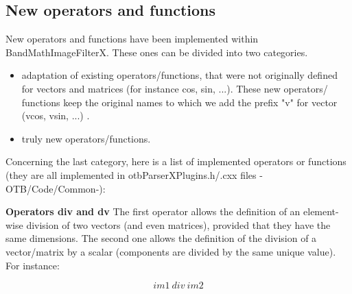 \begin{center}
\end{center}


\subsection{New operators and functions}\label{ssec:operators}

New operators and functions have been implemented within 
BandMathImageFilterX. These ones can be divided into two categories.

\begin{itemize}
\item adaptation of existing operators/functions, that were not originally defined for vectors and matrices (for instance cos, sin, ...). These new operators/ functions keep the original names to which we add the prefix "v" for vector (vcos, vsin, ...) .
\item truly new operators/functions.
\end{itemize}


Concerning the last category, here is a list of implemented 
operators or functions (they are all implemented in 
otbParserXPlugins.h/.cxx files -OTB/Code/Common-):

\textbf{Operators div and dv} \newline
The first operator allows the definition of an element-wise division of two vectors (and even matrices), provided that they have the same dimensions.
The second one allows the definition of the division of a vector/matrix by a scalar (components are divided by the same unique value). For instance: 

\begin{equation}
	im1 ~ div ~ im2
\end{equation}

